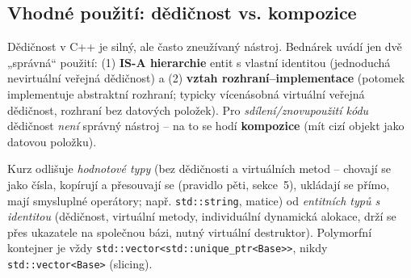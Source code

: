 \documentclass[11pt,a4paper]{article}
\newcommand{\cd}{\lstinline[style=cpp]}
\begin{document}
\subsection{Vhodné použití: dědičnost vs. kompozice}

\begin{intuice}
Dědičnost v C++ je silný, ale často zneužívaný nástroj. Bednárek uvádí jen dvě „správná`` použití: (1) \textbf{IS-A hierarchie} entit s vlastní identitou (jednoduchá nevirtuální veřejná dědičnost) a (2) \textbf{vztah rozhraní--implementace} (potomek implementuje abstraktní rozhraní; typicky vícenásobná virtuální veřejná dědičnost, rozhraní bez datových položek). Pro \emph{sdílení/znovupoužití kódu} dědičnost \emph{není} správný nástroj -- na to se hodí \textbf{kompozice} (mít cizí objekt jako datovou položku).
\end{intuice}

\begin{poznamka}
Kurz odlišuje \emph{hodnotové typy} (bez dědičnosti a virtuálních metod -- chovají se jako čísla, kopírují a přesouvají se (pravidlo pěti, sekce~5), ukládají se přímo, mají smysluplné operátory; např. \texttt{std::string}, matice) od \emph{entitních typů s identitou} (dědičnost, virtuální metody, individuální dynamická alokace, drží se přes ukazatele na společnou bázi, nutný virtuální destruktor). Polymorfní kontejner je vždy \cd{std::vector<std::unique_ptr<Base>>}, nikdy \cd{std::vector<Base>} (slicing).
\end{poznamka}
\end{document}
